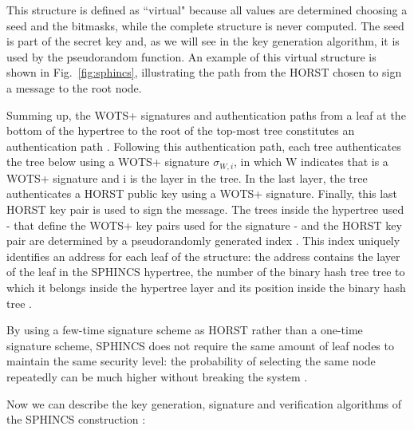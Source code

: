\documentclass[a4paper,12pt]{article}
\def\myfig#1{Fig.~#1\xspace}
\begin{document}
This structure is defined as ``virtual" because all values are determined choosing a seed and the bitmasks, while the complete structure is never computed.
The seed is part of the secret key and, as we will see in the key generation algorithm, it is used by the pseudorandom function.
An example of this virtual structure is shown in  \myfig{\ref{fig:sphincs}}, illustrating the path from the HORST chosen to sign a message to the root node.


Summing up, the WOTS+ signatures and authentication paths from a leaf at the bottom of the hypertree to the root of the top-most tree constitutes an authentication path \cite{3_SPHINCS_secondpaper}. Following this authentication path, each tree authenticates the tree below using a WOTS+ signature $\sigma_{W,i}$, in which W indicates that is a WOTS+ signature and i is the layer in the tree. In the last layer, the tree authenticates a HORST public key using a WOTS+ signature.
Finally, this last HORST key pair is used to sign the message.
The trees inside the hypertree used - that define the WOTS+ key pairs used for the signature - and the HORST key pair are determined by a pseudorandomly generated index \cite{1_sphincspaper}.
This index uniquely identifies an address for each leaf of the structure: the address contains the layer of the leaf in the SPHINCS hypertree, the number of the binary hash tree tree to which it belongs inside the hypertree layer and its position inside the binary hash tree \cite{13_faultattacks}.

By using a few-time signature scheme as HORST rather than a one-time signature scheme, SPHINCS does not require the same amount of leaf nodes to maintain the same security level: the probability of selecting the same node repeatedly can be much higher without breaking the system \cite{8_ARM}.

Now we can describe the key generation, signature and verification algorithms of the SPHINCS construction \cite{1_sphincspaper}:
\end{document}
